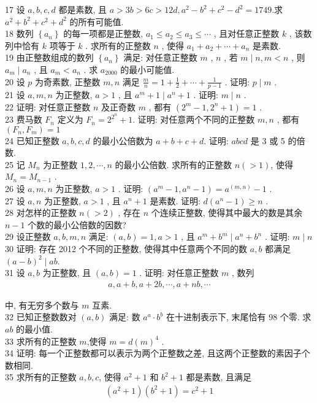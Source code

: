 17 设 $a ,  b ,  c ,  d$ 都是素数, 且 $a>3 b>6 c>12 d, a^{2}-b^{2}+c^{2}-d^{2}=1749$.求 $a^{2}+b^{2}+c^{2}+d^{2}$ 的所有可能值. \\
18 数列 $\left\{a_{n}\right\}$ 的每一项都是正整数,  $a_{1} \leqslant a_{2} \leqslant a_{3} \leqslant \cdots$ , 且对任意正整数 $k$ , 该数列中恰有 $k$ 项等于 $k$ . 求所有的正整数 $n$ , 使得 $a_{1}+a_{2}+\cdots+a_{n}$ 是素数. \\
19 由正整数组成的数列 $\left\{a_{n}\right\}$ 满足: 对任意正整数 $m$ ,  $n$ , 若 $m \mid n ,  m<n$ , 则 $a_{m} \mid a_{n}$ , 且 $a_{m}<a_{n}$ . 求 $a_{2000}$ 的最小可能值. \\
20 设 $p$ 为奇素数, 正整数 $m ,  n$ 满足 $\frac{m}{n}=1+\frac{1}{2}+\cdots+\frac{1}{p-1}$ . 证明:  $p \mid m$ . \\
21 设 $a ,  m ,  n$ 为正整数,  $a>1$ , 且 $a^{m}+1 \mid a^{n}+1$ . 证明:  $m \mid n$ . \\
22 证明: 对任意正整数 $n$ 及正奇数 $m$ , 都有 $\left(2^{m}-1,2^{n}+1\right)=1$ . \\
23 费马数 $F_{n}$ 定义为 $F_{n}=2^{2^{n}}+1$. 证明: 对任意两个不同的正整数 $m ,  n$ , 都有 $\left(F_{n}, F_{m}\right)=1$\\
24 已知正整数 $a ,  b ,  c ,  d$ 的最小公倍数为 $a+b+c+d$. 证明: $a b c d$ 是 3 或 5 的倍数. \\
25 记 $M_{n}$ 为正整数 $1,2, \cdots, n$ 的最小公倍数. 求所有的正整数 $n(>1)$, 使得 $M_{n}=M_{n-1}$ . \\
26 设 $a ,  m ,  n$ 为正整数,  $a>1$ . 证明:  $\left(a^{m}-1, a^{n}-1\right)=a^{(m, n)}-1$ . \\
27 设 $a ,  n$ 为正整数,  $a>1$ , 且 $a^{n}+1$ 是素数. 证明:  $d\left(a^{n}-1\right) \geqslant n$ . \\
28 对怎样的正整数 $n(>2)$ , 存在 $n$ 个连续正整数, 使得其中最大的数是其余 $n-1$ 个数的最小公倍数的因数?\\
29 设正整数 $a ,  b ,  m ,  n$ 满足:  $(a, b)=1, a>1$ , 且 $a^{m}+b^{m} \mid a^{n}+b^{n}$ . 证明:  $m \mid n$\\
30 证明: 存在 2012 个不同的正整数, 使得其中任意两个不同的数 $a ,  b$ 都满足 $(a-b)^{2} \mid a b$.\\
31 设 $a ,  b$ 为正整数, 且 $(a, b)=1$ . 证明: 对任意正整数 $m$ , 数列
\begin{align*}
	a, a+b, a+2 b, \cdots, a+n b, \cdots
\end{align*}

中, 有无穷多个数与 $m$ 互素.\\
32 已知正整数数对 $(a, b)$ 满足: 数 $a^{a} \cdot b^{b}$ 在十进制表示下, 末尾恰有 98 个零. 求 $a b$ 的最小值. \\
33 求所有的正整数 $m$,使得 $m=d(m)^{4}$ . \\
34 证明: 每一个正整数都可以表示为两个正整数之差, 且这两个正整数的素因子个数相同. \\
35 求所有的正整数 $a ,  b ,  c$, 使得 $a^{2}+1$ 和 $b^{2}+1$ 都是素数, 且满足
\begin{align*}
	\left(a^{2}+1\right)\left(b^{2}+1\right)=c^{2}+1
\end{align*}

